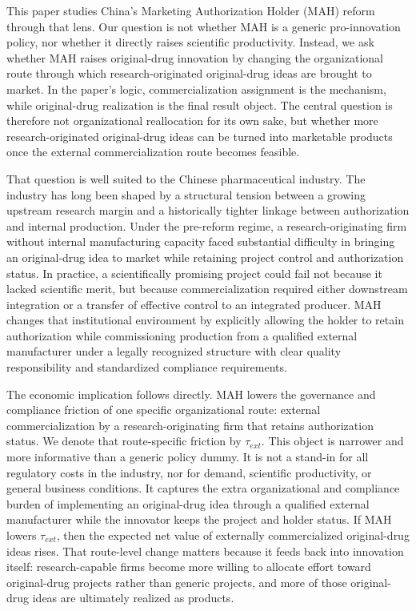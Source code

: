 \documentclass[12pt]{article}
\begin{document}
This paper studies China's Marketing Authorization Holder (MAH) reform through that lens. Our question is not whether MAH is a generic pro-innovation policy, nor whether it directly raises scientific productivity. Instead, we ask whether MAH raises original-drug innovation by changing the organizational route through which research-originated original-drug ideas are brought to market. In the paper's logic, commercialization assignment is the mechanism, while original-drug realization is the final result object. The central question is therefore not organizational reallocation for its own sake, but whether more research-originated original-drug ideas can be turned into marketable products once the external commercialization route becomes feasible.

That question is well suited to the Chinese pharmaceutical industry. The industry has long been shaped by a structural tension between a growing upstream research margin and a historically tighter linkage between authorization and internal production. Under the pre-reform regime, a research-originating firm without internal manufacturing capacity faced substantial difficulty in bringing an original-drug idea to market while retaining project control and authorization status. In practice, a scientifically promising project could fail not because it lacked scientific merit, but because commercialization required either downstream integration or a transfer of effective control to an integrated producer. MAH changes that institutional environment by explicitly allowing the holder to retain authorization while commissioning production from a qualified external manufacturer under a legally recognized structure with clear quality responsibility and standardized compliance requirements.

The economic implication follows directly. MAH lowers the governance and compliance friction of one specific organizational route: external commercialization by a research-originating firm that retains authorization status. We denote that route-specific friction by $\tau_{ext}$. This object is narrower and more informative than a generic policy dummy. It is not a stand-in for all regulatory costs in the industry, nor for demand, scientific productivity, or general business conditions. It captures the extra organizational and compliance burden of implementing an original-drug idea through a qualified external manufacturer while the innovator keeps the project and holder status. If MAH lowers $\tau_{ext}$, then the expected net value of externally commercialized original-drug ideas rises. That route-level change matters because it feeds back into innovation itself: research-capable firms become more willing to allocate effort toward original-drug projects rather than generic projects, and more of those original-drug ideas are ultimately realized as products.
\end{document}
